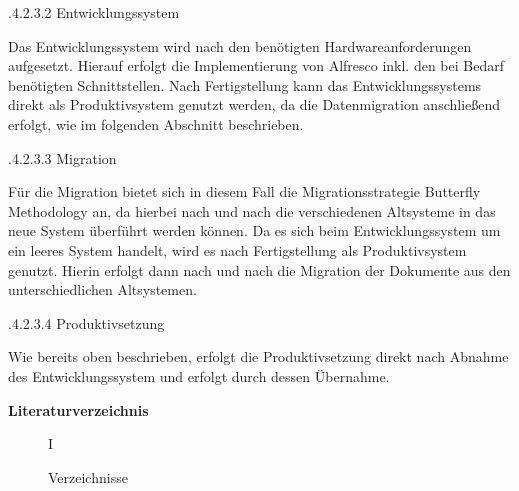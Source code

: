 \documentclass[a4paper]{article}
\begin{document}
{.4.2.3.2 Entwicklungssystem}


\bigskip

{\sffamily
Das Entwicklungssystem wird nach den benötigten Hardwareanforderungen aufgesetzt. Hierauf erfolgt die Implementierung
von Alfresco inkl. den bei Bedarf benötigten Schnittstellen. Nach Fertigstellung kann das Entwicklungssystems direkt
als Produktivsystem genutzt werden, da die Datenmigration anschließend erfolgt, wie im folgenden Abschnitt
beschrieben.}


\bigskip

{.4.2.3.3 Migration}


\bigskip

{\sffamily
Für die Migration bietet sich in diesem Fall die Migrationsstrategie Butterfly Methodology an, da hierbei nach und nach
die verschiedenen Altsysteme in das neue System überführt werden können. Da es sich beim Entwicklungssystem um ein
{\textquotedbl}leeres{\textquotedbl} System handelt, wird es nach Fertigstellung als Produktivsystem genutzt. Hierin
erfolgt dann nach und nach die Migration der Dokumente aus den unterschiedlichen Altsystemen.}


\bigskip

{.4.2.3.4 Produktivsetzung}


\bigskip

{\sffamily
Wie bereits oben beschrieben, erfolgt die Produktivsetzung direkt nach Abnahme des Entwicklungssystem und erfolgt durch
dessen Übernahme. }


\bigskip


\bigskip

\clearpage
\bigskip

{\sffamily\bfseries
Literaturverzeichnis}

\begin{figure}
\centering
\begin{minipage}{2.54cm}
{\raggedleft\sffamily
I
\par}
\end{minipage}
\end{figure}
\begin{figure}
\centering
\begin{minipage}{7.938cm}
{\sffamily
Verzeichnisse}
\end{minipage}
\end{figure}

\bigskip
\end{document}
